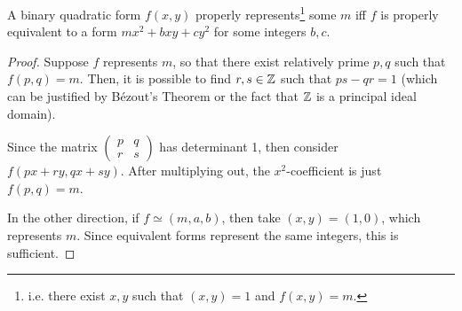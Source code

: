 \begin{prop}
A binary quadratic form $f(x,y)$ properly represents\footnote{i.e. there exist $x,y$ such that $(x,y) = 1$ and $f(x,y) = m$.} some $m$ iff $f$ is properly equivalent to a form $mx^2+bxy+cy^2$ for some integers $b,c$.
\end{prop}
\begin{proof}
Suppose $f$ represents $m$, so that there exist relatively prime $p,q$ such that $f(p,q) = m$. Then, it is possible to find $r,s\in\mathbb{Z}$ such that $ps-qr = 1$ (which can be justified by B\'ezout's Theorem or the fact that $\mathbb{Z}$ is a principal ideal domain).

Since the matrix
$\begin{pmatrix} p&q\\r&s\end{pmatrix}$ has determinant 1, then consider $f(px+ry,qx+sy)$. After multiplying out, the $x^2$-coefficient is just $f(p,q) = m$.

In the other direction, if $f \simeq (m,a,b)$, then take $(x,y) = (1,0)$, which represents $m$. Since equivalent forms represent the same integers, this is sufficient.
\end{proof}

